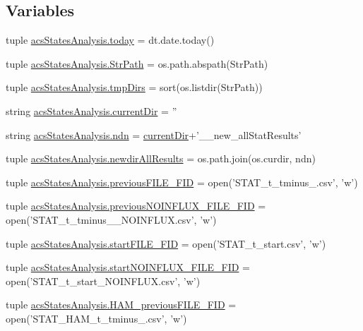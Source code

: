 \subsection*{Variables}
\begin{DoxyCompactItemize}
\item 
tuple \hyperlink{a00104_ac99ee9d8196d8a2305b9f4c795b23b97}{acs\-States\-Analysis.\-today} = dt.\-date.\-today()
\item 
tuple \hyperlink{a00104_ac34f3f43f888eb6620266d78ce928ceb}{acs\-States\-Analysis.\-Str\-Path} = os.\-path.\-abspath(Str\-Path)
\item 
tuple \hyperlink{a00104_ab71c19ee20acae0f07934a8d0e9fe50b}{acs\-States\-Analysis.\-tmp\-Dirs} = sort(os.\-listdir(Str\-Path))
\item 
string \hyperlink{a00104_ae98225d5c8c20399f5c3b888fa37746f}{acs\-States\-Analysis.\-current\-Dir} = ''
\item 
string \hyperlink{a00104_a5e117df6e0cdffdae13947622c6c4890}{acs\-States\-Analysis.\-ndn} = \hyperlink{a00031_af32eb97339f1e9d37b5540de2cbc79c9}{current\-Dir}+'\-\_\-\_\-new\-\_\-all\-Stat\-Results'
\item 
tuple \hyperlink{a00104_a62d6cfd52b4428ab7ea4d75d43b2d49b}{acs\-States\-Analysis.\-newdir\-All\-Results} = os.\-path.\-join(os.\-curdir, ndn)
\item 
tuple \hyperlink{a00104_aba65725a1bd6d1b891b02dc7f3db2335}{acs\-States\-Analysis.\-previous\-F\-I\-L\-E\-\_\-\-F\-I\-D} = open('S\-T\-A\-T\-\_\-t\-\_\-tminus\-\_.\-csv', 'w')
\item 
tuple \hyperlink{a00104_a9f9485bf6f7a3734bbd110b756005b71}{acs\-States\-Analysis.\-previous\-N\-O\-I\-N\-F\-L\-U\-X\-\_\-\-F\-I\-L\-E\-\_\-\-F\-I\-D} = open('S\-T\-A\-T\-\_\-t\-\_\-tminus\-\_\-\_\-\-N\-O\-I\-N\-F\-L\-U\-X.\-csv', 'w')
\item 
tuple \hyperlink{a00104_a0239a9dcc4900463a0c19557bec23521}{acs\-States\-Analysis.\-start\-F\-I\-L\-E\-\_\-\-F\-I\-D} = open('S\-T\-A\-T\-\_\-t\-\_\-start.\-csv', 'w')
\item 
tuple \hyperlink{a00104_a44f4f158af9771fbabbbacc4f4484d32}{acs\-States\-Analysis.\-start\-N\-O\-I\-N\-F\-L\-U\-X\-\_\-\-F\-I\-L\-E\-\_\-\-F\-I\-D} = open('S\-T\-A\-T\-\_\-t\-\_\-start\-\_\-\-N\-O\-I\-N\-F\-L\-U\-X.\-csv', 'w')
\item 
tuple \hyperlink{a00104_a3aad86d2cdbfb6f36b4b563b190d76c9}{acs\-States\-Analysis.\-H\-A\-M\-\_\-previous\-F\-I\-L\-E\-\_\-\-F\-I\-D} = open('S\-T\-A\-T\-\_\-\-H\-A\-M\-\_\-t\-\_\-tminus\-\_.\-csv', 'w')
\item 

\end{DoxyCompactItemize}
